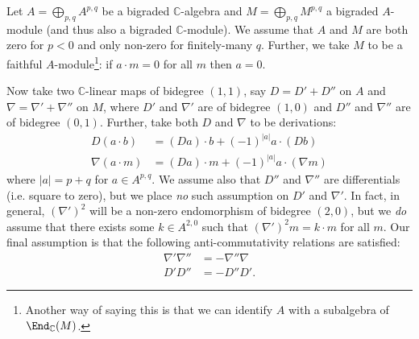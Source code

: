         \bigskip

        Let $A=\bigoplus_{p,q}A^{p,q}$ be a bigraded $\mathbb{C}$-algebra and $M=\bigoplus_{p,q}M^{p,q}$ a bigraded $A$-module (and thus also a bigraded $\mathbb{C}$-module).
        We assume that $A$ and $M$ are both zero for $p<0$ and only non-zero for finitely-many $q$.
        Further, we take $M$ to be a faithful $A$-module\footnote{Another way of saying this is that we can identify $A$ with a subalgebra of $\End_\mathbb{C}(M)$.}: if $a\cdot m=0$ for all $m$ then $a=0$.

        Now take two $\mathbb{C}$-linear maps of bidegree $(1,1)$, say $D=D'+D''$ on $A$ and $\nabla=\nabla'+\nabla''$ on $M$, where $D'$ and $\nabla'$ are of bidegree $(1,0)$ and $D''$ and $\nabla''$ are of bidegree $(0,1)$.
        Further, take both $D$ and $\nabla$ to be derivations:
        \begin{align*}
            D(a\cdot b) &= (Da)\cdot b + (-1)^{|a|}a\cdot(Db)\\
            \nabla(a\cdot m) &= (Da)\cdot m + (-1)^{|a|}a\cdot(\nabla m)
        \end{align*}
        where $|a|=p+q$ for $a\in A^{p,q}$.
        We assume also that $D''$ and $\nabla''$ are differentials (i.e. square to zero), but we place \textit{no} such assumption on $D'$ and $\nabla'$.
        In fact, in general, $(\nabla')^2$ will be a non-zero endomorphism of bidegree $(2,0)$, but we \textit{do} assume that there exists some $k\in A^{2,0}$ such that $(\nabla')^2m=k\cdot m$ for all $m$.
        Our final assumption is that the following anti-commutativity relations are satisfied:
        \begin{align*}
            \nabla'\nabla'' &= -\nabla''\nabla\\
            D'D'' &= - D''D'.
        \end{align*}

        \bigskip

